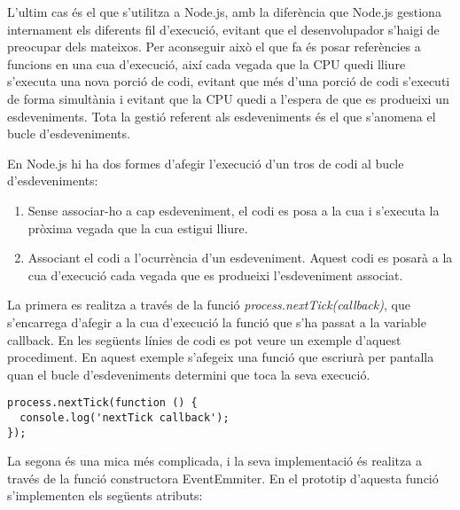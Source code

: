 L'ultim cas és el que s'utilitza a Node.js, amb la diferència que Node.js gestiona internament els diferents fil d'execució, evitant que el desenvolupador s'haigi de preocupar dels mateixos. Per aconseguir això el que fa és posar referències a funcions en una cua d'execució, així cada vegada que la CPU quedi lliure s'executa una nova porció de codi, evitant que més d'una porció de codi s'executi de forma simultània i evitant que la CPU quedi a l'espera de que es produeixi un esdeveniments. Tota la gestió referent als esdeveniments és el que s'anomena el bucle d'esdeveniments. 

En Node.js hi ha dos formes d'afegir l'execució d'un tros de codi al bucle d'esdeveniments: 

\begin{enumerate}
    \item{Sense associar-ho a cap esdeveniment, el codi es posa a la cua i s'executa la pròxima vegada que la cua estigui lliure.}
    \item{Associant el codi a l'ocurrència d'un esdeveniment. Aquest codi es posarà a la cua d'execució cada vegada que es produeixi l'esdeveniment associat.}
\end{enumerate}

La primera es realitza a través de la funció \emph{process.nextTick(callback)}, que s'encarrega d'afegir a la cua d'execució la funció que s'ha passat a la variable callback. En les següents línies de codi es pot veure un exemple d'aquest procediment. En aquest exemple s'afegeix una funció que escriurà per pantalla quan el bucle d'esdeveniments determini que toca la seva execució.

\begin{lstlisting}
process.nextTick(function () {
  console.log('nextTick callback');
});
\end{lstlisting}

La segona és una mica més complicada, i la seva implementació és realitza a través de la funció constructora EventEmmiter. En el prototip d'aquesta funció s'implementen els següents atributs: 

